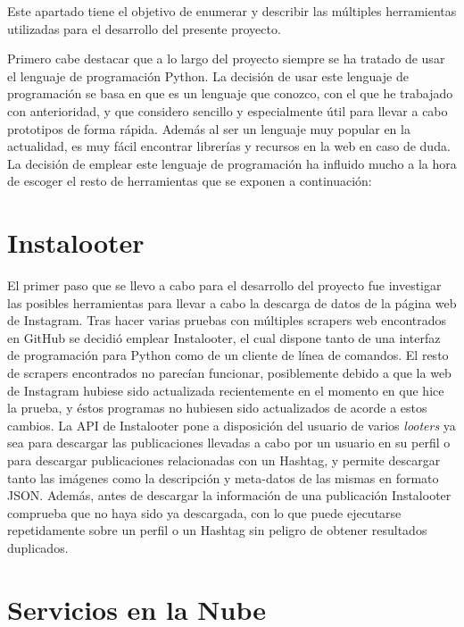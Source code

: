 
Este apartado tiene el objetivo de enumerar y describir las múltiples herramientas utilizadas para el desarrollo del presente proyecto.

Primero cabe destacar que a lo largo del proyecto siempre se ha tratado de usar el lenguaje de programación Python. La decisión de usar este lenguaje de programación se basa en que es un lenguaje que conozco, con el que he trabajado con anterioridad, y que considero sencillo y especialmente útil para llevar a cabo prototipos de forma rápida. Además al ser un lenguaje muy popular en la actualidad, es muy fácil encontrar librerías y recursos en la web en caso de duda. La decisión de emplear este lenguaje de programación ha influido mucho a la hora de escoger el resto de herramientas que se exponen a continuación:

\section{Instalooter}

El primer paso que se llevo a cabo para el desarrollo del proyecto fue investigar las posibles herramientas para llevar a cabo la descarga de datos de la página web de Instagram. Tras hacer varias pruebas con múltiples scrapers web encontrados en GitHub se decidió emplear Instalooter, el cual dispone tanto de una interfaz de programación para Python como de un cliente de línea de comandos. El resto de scrapers encontrados no parecían funcionar, posiblemente debido a que la web de Instagram hubiese sido actualizada recientemente en el momento en que hice la prueba, y éstos programas no hubiesen sido actualizados de acorde a estos cambios. La API de Instalooter pone a disposición del usuario de varios \textit{looters} ya sea para descargar las publicaciones llevadas a cabo por un usuario en su perfil o para descargar publicaciones relacionadas con un Hashtag, y permite descargar tanto las imágenes como la descripción y meta-datos de las mismas en formato JSON. Además, antes de descargar la información de una publicación Instalooter comprueba que no haya sido ya descargada, con lo que puede ejecutarse repetidamente sobre un perfil o un Hashtag sin peligro de obtener resultados duplicados.

\section{Servicios en la Nube}


